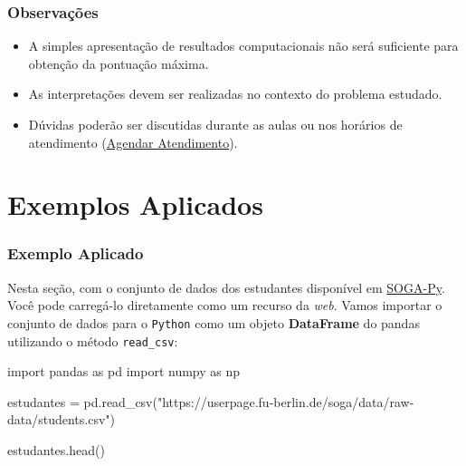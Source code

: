 \documentclass[
  letterpaper,
  DIV=11,
  numbers=noendperiod]{scrreprt}
\newenvironment{Shaded}{\begin{snugshade}}{\end{snugshade}}
\newcommand{\ImportTok}[1]{\textcolor[rgb]{0.00,0.46,0.62}{#1}}
\newcommand{\NormalTok}[1]{\textcolor[rgb]{0.00,0.23,0.31}{#1}}
\newcommand{\OperatorTok}[1]{\textcolor[rgb]{0.37,0.37,0.37}{#1}}
\newcommand{\StringTok}[1]{\textcolor[rgb]{0.13,0.47,0.30}{#1}}
\providecommand{\tightlist}{%
  \setlength{\itemsep}{0pt}\setlength{\parskip}{0pt}}\usepackage{longtable,booktabs,array}
\begin{document}
\subsection{Observações}\label{observauxe7uxf5es}

\begin{itemize}
\tightlist
\item
  A simples apresentação de resultados computacionais não será
  suficiente para obtenção da pontuação máxima.
\item
  As interpretações devem ser realizadas no contexto do problema
  estudado.
\item
  Dúvidas poderão ser discutidas durante as aulas ou nos horários de
  atendimento (\href{https://appt.link/santosneto/atendimentos}{Agendar
  Atendimento}).
\end{itemize}


\chapter{Exemplos Aplicados}\label{exemplos-aplicados}

\subsection{Exemplo Aplicado}\label{exemplo-aplicado}

Nesta seção, com o conjunto de dados dos estudantes disponível em
\href{https://www.geo.fu-berlin.de/en/v/soga-py/Basics-of-statistics/Hypothesis-Tests/index.html}{SOGA-Py}.
Você pode carregá-lo diretamente como um recurso da \emph{web}. Vamos
importar o conjunto de dados para o \texttt{Python} como um objeto
\textbf{DataFrame} do pandas utilizando o método \texttt{read\_csv}:

\begin{Shaded}
\begin{Highlighting}[]
\ImportTok{import}\NormalTok{ pandas }\ImportTok{as}\NormalTok{ pd}
\ImportTok{import}\NormalTok{ numpy }\ImportTok{as}\NormalTok{ np}

\NormalTok{estudantes }\OperatorTok{=}\NormalTok{ pd.read\_csv(}\StringTok{"https://userpage.fu{-}berlin.de/soga/data/raw{-}data/students.csv"}\NormalTok{)}

\NormalTok{estudantes.head()}
\end{Highlighting}
\end{Shaded}
\end{document}

